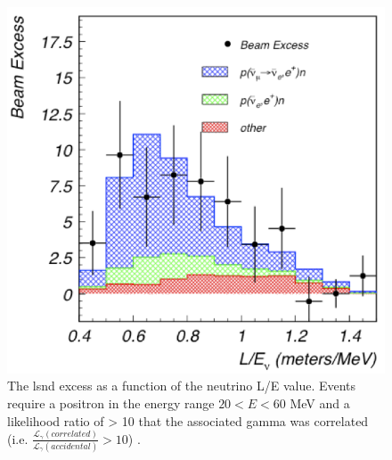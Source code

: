 \begin{figure}[h!]
    \centering
    \includegraphics[width = \largefigwidth]{figures-chap2/LSND_excess.png}
    \caption[LSND excess.]{The \gls{lsnd} excess as a function of the neutrino L/E value. Events require a positron in the energy range $20 < E < 60$ MeV and a likelihood ratio of > 10 that the associated gamma was correlated (i.e. $\frac{\mathcal{L}_{\gamma}(correlated)}{\mathcal{L}_{\gamma}(accidental)} > 10$) \cite{LSND_excess}.}
    \label{fig:LSND excess}
\end{figure}
\newpage

